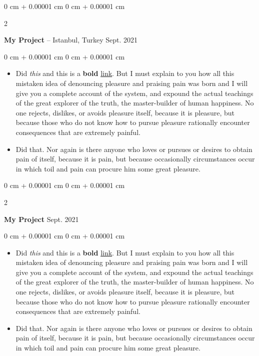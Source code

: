 \documentclass[10pt, letterpaper]{article}
\newenvironment{highlights}{
    \begin{itemize}[
        topsep=0.10 cm,
        parsep=0.10 cm,
        partopsep=0pt,
        itemsep=0pt,
        leftmargin=0 cm + 10pt
    ]
}{
    \end{itemize}
} %
\newenvironment{onecolentry}{
    \begin{adjustwidth}{
        0 cm + 0.00001 cm
    }{
        0 cm + 0.00001 cm
    }
}{
    \end{adjustwidth}
} %
\newenvironment{twocolentry}[2][]{
    \onecolentry
    \def\secondColumn{#2}
    \setcolumnwidth{\fill, 4.5 cm}
    \begin{paracol}{2}
}{
    \switchcolumn \raggedleft \secondColumn
    \end{paracol}
    \endonecolentry
} %
\begin{document}
        \vspace{0.2 cm}

        \begin{twocolentry}{
            Sept. 2021
        }
            \textbf{My Project} -- Istanbul, Turkey\end{twocolentry}

        \vspace{0.10 cm}
        \begin{onecolentry}
            \begin{highlights}
                \item Did \textit{this} and this is a \textbf{bold} \href{https://example.com}{link}. But I must explain to you how all this mistaken idea of denouncing pleasure and praising pain was born and I will give you a complete account of the system, and expound the actual teachings of the great explorer of the truth, the master-builder of human happiness. No one rejects, dislikes, or avoids pleasure itself, because it is pleasure, but because those who do not know how to pursue pleasure rationally encounter consequences that are extremely painful.
                \item Did that. Nor again is there anyone who loves or pursues or desires to obtain pain of itself, because it is pain, but because occasionally circumstances occur in which toil and pain can procure him some great pleasure.
            \end{highlights}
        \end{onecolentry}


        \vspace{0.2 cm}

        \begin{twocolentry}{
            Sept. 2021
        }
            \textbf{My Project}\end{twocolentry}

        \vspace{0.10 cm}
        \begin{onecolentry}
            \begin{highlights}
                \item Did \textit{this} and this is a \textbf{bold} \href{https://example.com}{link}. But I must explain to you how all this mistaken idea of denouncing pleasure and praising pain was born and I will give you a complete account of the system, and expound the actual teachings of the great explorer of the truth, the master-builder of human happiness. No one rejects, dislikes, or avoids pleasure itself, because it is pleasure, but because those who do not know how to pursue pleasure rationally encounter consequences that are extremely painful.
                \item Did that. Nor again is there anyone who loves or pursues or desires to obtain pain of itself, because it is pain, but because occasionally circumstances occur in which toil and pain can procure him some great pleasure.
            \end{highlights}
        \end{onecolentry}
\end{document}
